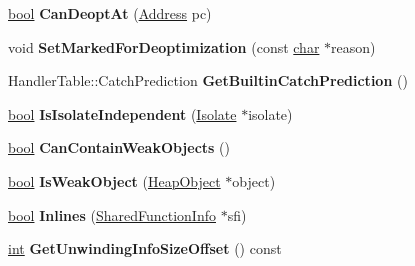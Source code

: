 \begin{DoxyCompactItemize}
\item 
\mbox{\label{classv8_1_1internal_1_1Code_a9fec9635426df94d27beabb15ab45dd6}} 
\mbox{\hyperlink{classbool}{bool}} {\bfseries Can\+Deopt\+At} (\mbox{\hyperlink{classuintptr__t}{Address}} pc)
\item 
\mbox{\label{classv8_1_1internal_1_1Code_a2e608402ad19f17a96799f3d24beecb4}} 
void {\bfseries Set\+Marked\+For\+Deoptimization} (const \mbox{\hyperlink{classchar}{char}} $\ast$reason)
\item 
\mbox{\label{classv8_1_1internal_1_1Code_a9e88bc8925cd37ea29f523a6fb47c5ed}} 
Handler\+Table\+::\+Catch\+Prediction {\bfseries Get\+Builtin\+Catch\+Prediction} ()
\item 
\mbox{\label{classv8_1_1internal_1_1Code_aef14bd2ddb2ca965c21eb639e7842f09}} 
\mbox{\hyperlink{classbool}{bool}} {\bfseries Is\+Isolate\+Independent} (\mbox{\hyperlink{classv8_1_1internal_1_1Isolate}{Isolate}} $\ast$isolate)
\item 
\mbox{\label{classv8_1_1internal_1_1Code_a11b116ebb4cbb076b68a27c5c28ec997}} 
\mbox{\hyperlink{classbool}{bool}} {\bfseries Can\+Contain\+Weak\+Objects} ()
\item 
\mbox{\label{classv8_1_1internal_1_1Code_aa1309de0ba00bc3c9545a74caf09137b}} 
\mbox{\hyperlink{classbool}{bool}} {\bfseries Is\+Weak\+Object} (\mbox{\hyperlink{classv8_1_1internal_1_1HeapObject}{Heap\+Object}} $\ast$object)
\item 
\mbox{\label{classv8_1_1internal_1_1Code_a91268ac0e9b25c92eaffa6052f2c3a1d}} 
\mbox{\hyperlink{classbool}{bool}} {\bfseries Inlines} (\mbox{\hyperlink{classv8_1_1internal_1_1SharedFunctionInfo}{Shared\+Function\+Info}} $\ast$sfi)
\item 
\mbox{\label{classv8_1_1internal_1_1Code_a2b9a6bdbd02b9082af89ccc34e784de0}} 
\mbox{\hyperlink{classint}{int}} {\bfseries Get\+Unwinding\+Info\+Size\+Offset} () const
\end{DoxyCompactItemize}
